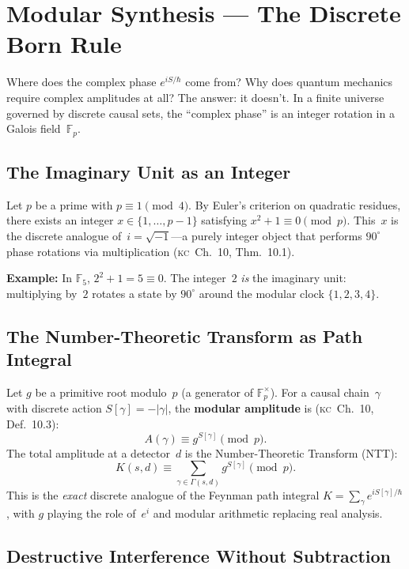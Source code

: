 \documentclass[11pt, a4paper, openany]{book}
\newcommand{\KC}[1]{\textnormal{(\textsc{kc}~#1)}}
\newcounter{thm}[chapter]
\begin{document}
\section{Modular Synthesis --- The Discrete Born Rule}\label{sec:modular}

Where does the complex phase $e^{iS/\hbar}$ come from? Why does quantum
mechanics require complex amplitudes at all? The answer: it doesn't.
In a finite universe governed by discrete causal sets, the ``complex
phase'' is an integer rotation in a Galois field~$\mathbb{F}_p$.

\subsection{The Imaginary Unit as an Integer}

Let $p$ be a prime with $p \equiv 1 \pmod{4}$. By Euler's criterion on
quadratic residues, there exists an integer $x \in \{1, \ldots, p-1\}$
satisfying $x^2 + 1 \equiv 0 \pmod{p}$. This~$x$ is the discrete
analogue of~$i = \sqrt{-1}$---a purely integer object that performs
$90^\circ$ phase rotations via multiplication \KC{Ch.~10, Thm.~10.1}.

\textbf{Example:} In $\mathbb{F}_5$, $2^2 + 1 = 5 \equiv 0$.
The integer~$2$ \emph{is} the imaginary unit: multiplying by~$2$
rotates a state by $90^\circ$ around the modular clock $\{1,2,3,4\}$.

\subsection{The Number-Theoretic Transform as Path Integral}

Let $g$ be a primitive root modulo~$p$ (a generator of
$\mathbb{F}_p^\times$). For a causal chain~$\gamma$ with discrete
action $S[\gamma] = -|\gamma|$, the \textbf{modular amplitude} is
\KC{Ch.~10, Def.~10.3}:
\[
  A(\gamma) \equiv g^{S[\gamma]} \pmod{p}.
\]
The total amplitude at a detector~$d$ is the Number-Theoretic
Transform (NTT):
\[
  K(s,d) \equiv \sum_{\gamma \in \Gamma(s,d)} g^{S[\gamma]} \pmod{p}.
\]
This is the \emph{exact} discrete analogue of the Feynman path
integral $K = \sum_\gamma e^{iS[\gamma]/\hbar}$, with $g$ playing
the role of~$e^{i}$ and modular arithmetic replacing real analysis.

\subsection{Destructive Interference Without Subtraction}
\end{document}
